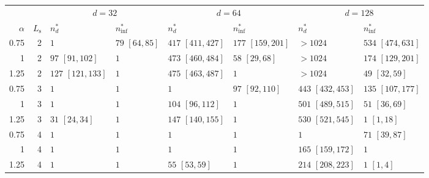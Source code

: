 \begin{tabular}{rr|ll|ll|ll}
\toprule
 & & \multicolumn{2}{c|}{$d=32$} & \multicolumn{2}{c|}{$d=64$} & \multicolumn{2}{c}{$d=128$}\\
$\alpha$ & $L_{\mathrm{s}}$ & $n^*_d$ & $n^*_{\mathrm{inf}}$ & $n^*_d$ & $n^*_{\mathrm{inf}}$ & $n^*_d$ & $n^*_{\mathrm{inf}}$\\
\midrule
0.75 & 2 & $1$ & $79$ {\scriptsize$[64,85]$} & $417$ {\scriptsize$[411,427]$} & $177$ {\scriptsize$[159,201]$} & $>1024$ & $534$ {\scriptsize$[474,631]$}\\
1 & 2 & $97$ {\scriptsize$[91,102]$} & $1$ & $473$ {\scriptsize$[460,484]$} & $58$ {\scriptsize$[29,68]$} & $>1024$ & $174$ {\scriptsize$[129,201]$}\\
1.25 & 2 & $127$ {\scriptsize$[121,133]$} & $1$ & $475$ {\scriptsize$[463,487]$} & $1$ & $>1024$ & $49$ {\scriptsize$[32,59]$}\\
\midrule
0.75 & 3 & $1$ & $1$ & $1$ & $97$ {\scriptsize$[92,110]$} & $443$ {\scriptsize$[432,453]$} & $135$ {\scriptsize$[107,177]$}\\
1 & 3 & $1$ & $1$ & $104$ {\scriptsize$[96,112]$} & $1$ & $501$ {\scriptsize$[489,515]$} & $51$ {\scriptsize$[36,69]$}\\
1.25 & 3 & $31$ {\scriptsize$[24,34]$} & $1$ & $147$ {\scriptsize$[140,155]$} & $1$ & $530$ {\scriptsize$[521,545]$} & $1$ {\scriptsize$[1,18]$}\\
\midrule
0.75 & 4 & $1$ & $1$ & $1$ & $1$ & $1$ & $71$ {\scriptsize$[39,87]$}\\
1 & 4 & $1$ & $1$ & $1$ & $1$ & $165$ {\scriptsize$[159,172]$} & $1$\\
1.25 & 4 & $1$ & $1$ & $55$ {\scriptsize$[53,59]$} & $1$ & $214$ {\scriptsize$[208,223]$} & $1$ {\scriptsize$[1,4]$}\\
\bottomrule
\end{tabular}
